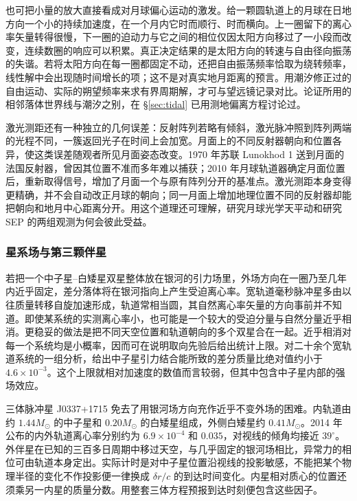 也可把小量的放大直接看成对月球偏心运动的激发。给一颗圆轨道上的月球在日地方向一个小的持续加速度，在一个月内它时而顺行、时而横向。上一圈留下的离心率矢量转得很慢，下一圈的迫动力与它之间的相位仅因太阳方向移过了一小段而改变，连续数圈的响应可以积累。真正决定结果的是太阳方向的转速与自由径向振荡的失谐。若将太阳方向在每一圈都固定不动，还把自由振荡频率恰取为绕转频率，线性解中会出现随时间增长的项；这不是对真实地月距离的预言。用潮汐修正过的自由运动、实际的朔望频率来求有界周期解，才可与望远镜记录对比。论证所用的相邻落体世界线与潮汐之别，在 \S\ref{sec:tidal} 已用测地偏离方程讨论过。

激光测距还有一种独立的几何误差：反射阵列若略有倾斜，激光脉冲照到阵列两端的光程不同，一簇返回光子在时间上会加宽。月面上的不同反射器朝向和位置各异，使这类误差随观者所见月面姿态改变。1970 年苏联 Lunokhod 1 送到月面的法国反射器，曾因其位置不准而多年难以捕获；2010 年月球轨道器确定月面位置后，重新取得信号，增加了月面一个与原有阵列分开的基准点。激光测距本身变得更精确，并不会自动改正月球的朝向；同一月面上增加地理位置不同的反射器却能把朝向和地月中心距离分开。用这个道理还可理解，研究月球光学天平动和研究 SEP 的两组观测为何会彼此受益。

\subsubsection{星系场与第三颗伴星}

若把一个中子星--白矮星双星整体放在银河的引力场里，外场方向在一圈乃至几年内近乎固定，差分落体将在银河指向上产生受迫离心率。宽轨道毫秒脉冲星多由以往质量转移自旋加速形成，轨道常相当圆，其自然离心率矢量的方向事前并不知道。即使某系统的实测离心率小，也可能是一个较大的受迫分量与自然分量近乎相消。更稳妥的做法是把不同天空位置和轨道朝向的多个双星合在一起。近乎相消对每一个系统均是小概率，因而可在说明取向先验后给出统计上限。对二十余个宽轨道系统的一组分析，给出中子星引力结合能所致的差分质量比绝对值约小于 $4.6\times10^{-3}$。这个上限就相对加速度的数值而言较弱，但其中包含中子星内部的强场效应。

三体脉冲星 J0337+1715 免去了用银河场方向充作近乎不变外场的困难。内轨道由约 $1.44 M_\odot$ 的中子星和 $0.20M_\odot$ 的白矮星组成，外侧白矮星约 $0.41 M_\odot$。2014 年公布的内外轨道离心率分别约为 $6.9\times10^{-4}$ 和 $0.035$，对视线的倾角均接近 $39^\circ$。外伴星在已知的三百多日周期中移过天空，与几乎固定的银河场相比，异常力的相位可由轨道本身定出。实际计时是对中子星位置沿视线的投影敏感，不能把某个物理半径的变化不作投影便一律换成 $\delta r/c$ 的到达时间变化。内星相对质心的位置还须乘另一内星的质量分数。用整套三体方程预报到达时刻便包含这些因子。

